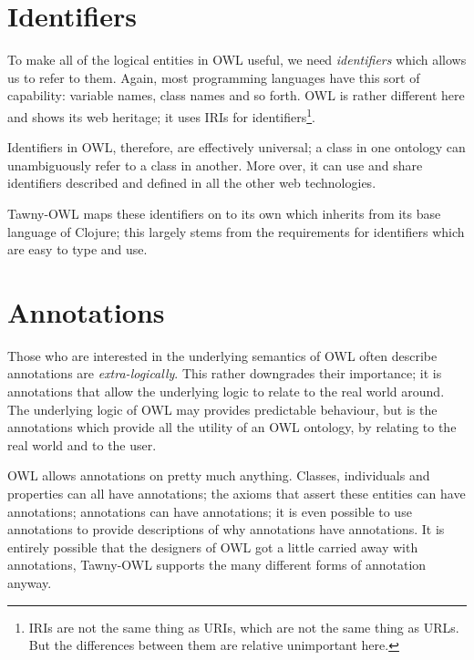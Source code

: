 \section{Identifiers}
\label{sec:identifiers}

To make all of the logical entities in OWL useful, we need
\emph{identifiers} which allows us to refer to them. Again, most
programming languages have this sort of capability: variable names,
class names and so forth. OWL is rather different here and shows its
web heritage; it uses IRIs for identifiers\footnote{IRIs are not the
  same thing as URIs, which are not the same thing as URLs. But the
  differences between them are relative unimportant here.}.

Identifiers in OWL, therefore, are effectively universal; a class in
one ontology can unambiguously refer to a class in another. More over,
it can use and share identifiers described and defined in all the
other web technologies.

Tawny-OWL maps these identifiers on to its own which inherits from its
base language of Clojure; this largely stems from the requirements for
identifiers which are easy to type and use.


\section{Annotations}
\label{sec:annotations}

Those who are interested in the underlying semantics of OWL often
describe annotations are \emph{extra-logically}. This rather
downgrades their importance; it is annotations that allow the
underlying logic to relate to the real world around. The underlying
logic of OWL may provides predictable behaviour, but is the
annotations which provide all the utility of an OWL ontology, by
relating to the real world and to the user.

OWL allows annotations on pretty much anything. Classes, individuals
and properties can all have annotations; the axioms that assert these
entities can have annotations; annotations can have annotations; it is
even possible to use annotations to provide descriptions of why
annotations have annotations. It is entirely possible that the
designers of OWL got a little carried away with annotations, Tawny-OWL
supports the many different forms of annotation anyway.
